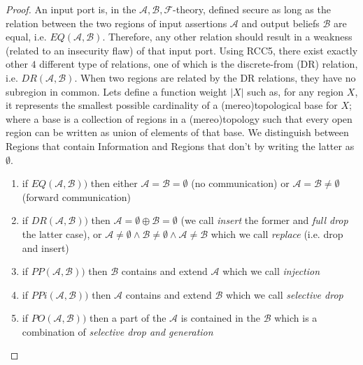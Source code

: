 \documentclass[conference]{IEEEtran}
\newcommand{\assertionRegion}{\mathcal{A}}
\newcommand{\beliefRegion}{\mathcal{B}}
\newcommand{\factRegion}{\mathcal{F}}
\newcommand{\abf}{\assertionRegion,\beliefRegion,\factRegion}
\newcommand{\eq}[2]{EQ(#1,#2)}
\newcommand{\pp}[2]{PP(#1,#2)}
\newcommand{\po}[2]{PO(#1,#2)}
\newcommand{\ppi}[2]{PPi(#1,#2)}
\newcommand{\dr}[2]{DR(#1,#2)}
\begin{document}
\begin{proof}
An input port is, in the $\abf$-theory, defined secure as long as the relation
	between the two regions of input assertions $\assertionRegion$ and
	output beliefs $\beliefRegion$ are equal, i.e.
	$\eq{\assertionRegion}{\beliefRegion}$. Therefore, any other relation
	should result in a weakness (related to an insecurity flaw) of that
	input port.  Using RCC5, there exist exactly other $4$ different type
	of relations, one of which is the discrete-from (DR) relation, i.e.
	$\dr{\assertionRegion}{\beliefRegion}$. When two regions are related by
	the DR relations, they have no subregion in common. Lets
	define a function weight $|X|$ such as, for any region $X$, it
	represents the smallest possible cardinality of a (mereo)topological base for
	$X$; where a base is a collection of regions in a (mereo)topology such that
	every open region can be written as union of elements of that base. 
	We distinguish between Regions that contain Information and Regions that
	don't by writing the latter as $\emptyset$.
	\begin{enumerate}
		\item if $\eq{\assertionRegion}{\beliefRegion})$ then either
			$\assertionRegion=\beliefRegion=\emptyset$ (no
			communication) or
			$\assertionRegion=\beliefRegion\neq\emptyset$ (forward
			communication)
		\item if $\dr{\assertionRegion}{\beliefRegion})$ then
			$\assertionRegion=\emptyset\oplus\beliefRegion=\emptyset$
			(we call \emph{insert} the former and \emph{full drop}
			the latter case), or
			$\assertionRegion\neq\emptyset\wedge\beliefRegion\neq\emptyset\wedge\assertionRegion\neq\beliefRegion$
			which we call \emph{replace} (i.e. drop and insert)
		\item if $\pp{\assertionRegion}{\beliefRegion})$ then
			$\beliefRegion$ contains and extend $\assertionRegion$
			which we call \emph{injection}
		\item if $\ppi{\assertionRegion}{\beliefRegion})$ then
			$\assertionRegion$ contains and extend $\beliefRegion$
			which we call \emph{selective drop}
		\item if $\po{\assertionRegion}{\beliefRegion})$ then a part of
			the $\assertionRegion$ is contained in the
			$\beliefRegion$ which is a combination of
			\emph{selective drop and generation}
	\end{enumerate}
\end{proof}
\end{document}
